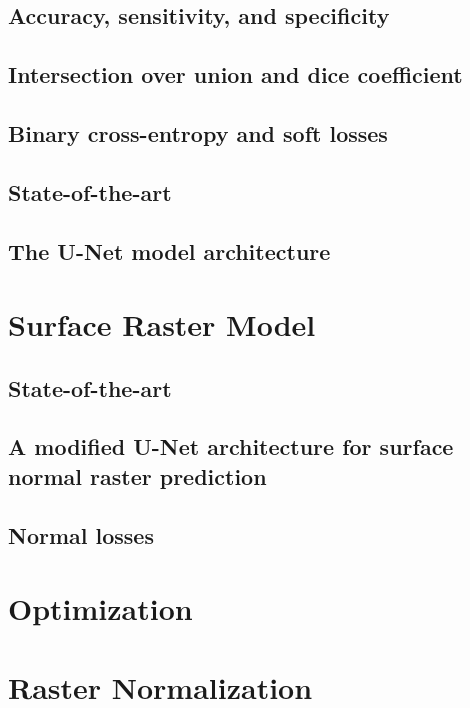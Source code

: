 \subsection{Accuracy, sensitivity, and specificity}

\subsection{Intersection over union and dice coefficient}

\subsection{Binary cross-entropy and soft losses}

\subsection{State-of-the-art}%
\label{sec:segmentation-state-of-the-art}

\subsection{The U-Net model architecture}%
\label{sec:unet}


\section{Surface Raster Model}
\subsection{State-of-the-art}
\subsection{A modified U-Net architecture for surface normal raster prediction}
\subsection{Normal losses}

\section{Optimization}


\section{Raster Normalization}%
\label{sec:raster-normalization}

